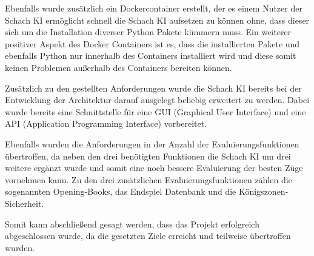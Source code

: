 Ebenfalls wurde zusätzlich ein Dockercontainer erstellt, der es einem Nutzer der Schach KI ermöglicht schnell die Schach KI aufsetzen zu können ohne, dass dieser sich um die Installation diverser Python Pakete kümmern muss. Ein weiterer positiver Aspekt des Docker Containers ist es, dass die installierten Pakete und ebenfalls Python nur innerhalb des Containers installiert wird und diese somit keinen Problemen außerhalb des Containers bereiten können.

Zusätzlich zu den gestellten Anforderungen wurde die Schach KI bereits bei der Entwicklung der Architektur darauf ausgelegt beliebig erweitert zu werden. Dabei wurde bereits eine Schnittstelle für eine \acs{GUI} (Graphical User Interface) und eine \acs{API} (Application Programming Interface) vorbereitet.

Ebenfalls wurden die Anforderungen in der Anzahl der Evaluierungsfunktionen übertroffen, da neben den drei benötigten Funktionen die Schach KI um drei weitere ergänzt wurde und somit eine noch bessere Evaluierung der besten Züge vornehmen kann. Zu den drei zusätzlichen Evaluierungsfunktionen zählen die sogenannten Opening-Books, das Endspiel Datenbank und die Königszonen-Sicherheit.

Somit kann abschließend gesagt werden, dass das Projekt erfolgreich abgeschlossen wurde, da die gesetzten Ziele erreicht und teilweise übertroffen wurden.

\iffalse


zusätzlich:
Dockerfile
Jupyter Notebook mit live compiling und Erklärungen
Aus 3 wurden 6 Evaluierungsfunktionen
History, Materialbewertung und attackierte Figuren
Vorbereitete Schnittstelle für GUI und API
Opening Book und Closing

2. Entwicklung einer KI für das Schach-Spiel

Das Schachspiel ist in der westlichen Welt das am weitesten verbreitete Brett-Spiel. Ziel der Studienarbeit
ist die Entwicklung eines Schachprogramms. Das wesentliche Ziel bei der Entwicklung dieses Programms
besteht darin, die Wirkungsweise der im Rahmen der KI-Vorlesung vorgestellten Algorithmen zu demonstrieren.
Insbesondere wird es wichtig sein, zur Evaluation einer Stellung eine gute Heuristik
zu entwickeln. Bei der Entwicklung dieser Heuristik sollen Techniken des Machine-Learnings eingesetzt
werden.

Anforderungen:
Keine hohe ELO Zahl
klarer/cleaner Code
Techniken aus Vorlesung erkennbar
Tagebuch führen
Regelmäßige Treffen
ASCII Ausgabe
Grundgerüst aufgesetzt
Einfacher Evaluierungsprozess
\fi

